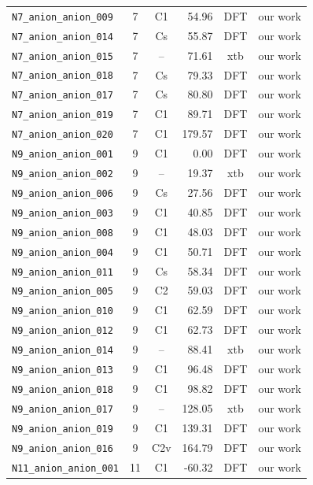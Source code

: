 {\begin{longtable}{@{}p{4.7cm}ccrcp{1.6cm}@{}}
\texttt{N7\_anion\_anion\_009} & 7 & C1 & 54.96 & DFT & our work \\
\texttt{N7\_anion\_anion\_014} & 7 & Cs & 55.87 & DFT & our work \\
\texttt{N7\_anion\_anion\_015} & 7 & -- & 71.61 & xtb & our work \\
\texttt{N7\_anion\_anion\_018} & 7 & Cs & 79.33 & DFT & our work \\
\texttt{N7\_anion\_anion\_017} & 7 & Cs & 80.80 & DFT & our work \\
\texttt{N7\_anion\_anion\_019} & 7 & C1 & 89.71 & DFT & our work \\
\texttt{N7\_anion\_anion\_020} & 7 & C1 & 179.57 & DFT & our work \\
\addlinespace
\texttt{N9\_anion\_anion\_001} & 9 & C1 & 0.00 & DFT & our work \\
\texttt{N9\_anion\_anion\_002} & 9 & -- & 19.37 & xtb & our work \\
\texttt{N9\_anion\_anion\_006} & 9 & Cs & 27.56 & DFT & our work \\
\texttt{N9\_anion\_anion\_003} & 9 & C1 & 40.85 & DFT & our work \\
\texttt{N9\_anion\_anion\_008} & 9 & C1 & 48.03 & DFT & our work \\
\texttt{N9\_anion\_anion\_004} & 9 & C1 & 50.71 & DFT & our work \\
\texttt{N9\_anion\_anion\_011} & 9 & Cs & 58.34 & DFT & our work \\
\texttt{N9\_anion\_anion\_005} & 9 & C2 & 59.03 & DFT & our work \\
\texttt{N9\_anion\_anion\_010} & 9 & C1 & 62.59 & DFT & our work \\
\texttt{N9\_anion\_anion\_012} & 9 & C1 & 62.73 & DFT & our work \\
\texttt{N9\_anion\_anion\_014} & 9 & -- & 88.41 & xtb & our work \\
\texttt{N9\_anion\_anion\_013} & 9 & C1 & 96.48 & DFT & our work \\
\texttt{N9\_anion\_anion\_018} & 9 & C1 & 98.82 & DFT & our work \\
\texttt{N9\_anion\_anion\_017} & 9 & -- & 128.05 & xtb & our work \\
\texttt{N9\_anion\_anion\_019} & 9 & C1 & 139.31 & DFT & our work \\
\texttt{N9\_anion\_anion\_016} & 9 & C2v & 164.79 & DFT & our work \\
\addlinespace
\texttt{N11\_anion\_anion\_001} & 11 & C1 & -60.32 & DFT & our work \\

\end{longtable}}
